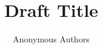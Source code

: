 \documentclass[review=false,nonacm]{acmart}
\title{Draft Title}
\author{Anonymous Authors}
\begin{document}
\begin{abstract}

\end{abstract}


\begin{titlepage}

\maketitle

\end{titlepage}



\end{document}
